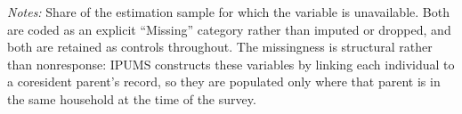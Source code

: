 \begin{table}[!htbp]
\centering
\caption{Missingness in Parental Education}
\label{tab:parent_educ_missing}
\begin{minipage}{\textwidth}
\footnotesize
\vspace{4pt}
\textit{Notes:} Share of the estimation sample for which the variable is unavailable. Both are coded as an explicit ``Missing'' category rather than imputed or dropped, and both are retained as controls throughout. The missingness is structural rather than nonresponse: IPUMS constructs these variables by linking each individual to a coresident parent's record, so they are populated only where that parent is in the same household at the time of the survey.
\end{minipage}
\end{table}
